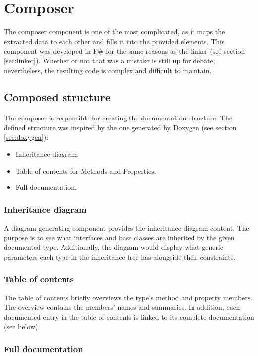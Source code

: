 \section{Composer}

The composer component is one of the most complicated, as it maps the extracted data to each other and fills it into the provided elements. This component was developed in F\# for the same reasons as the linker (see section \ref{sec:linker}). Whether or not that was a mistake is still up for debate; nevertheless, the resulting code is complex and difficult to maintain.

\subsection{Composed structure}

The composer is responsible for creating the documentation structure. The defined structure was inspired by the one generated by Doxygen (see section \ref{sec:doxygen}):
\begin{itemize}
    \item Inheritance diagram.
    \item Table of contents for Methods and Properties.
    \item Full documentation.
\end{itemize}

\subsubsection{Inheritance diagram}

A diagram-generating component provides the inheritance diagram content. The purpose is to see what interfaces and base classes are inherited by the given documented type. Additionally, the diagram would display what generic parameters each type in the inheritance tree has alongside their constraints.

\subsubsection{Table of contents}

The table of contents briefly overviews the type's method and property members. The overview contains the members' names and summaries. In addition, each documented entry in the table of contents is linked to its complete documentation (see below).

\subsubsection{Full documentation}

